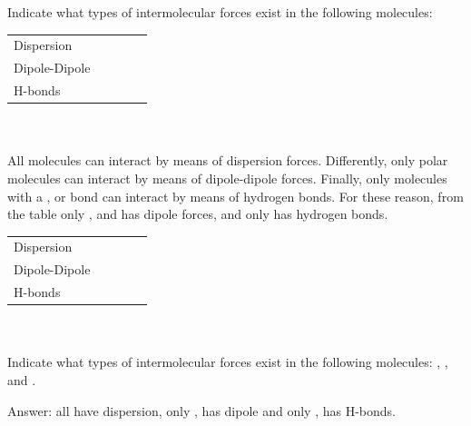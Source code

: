 \documentclass[main.tex]{subfiles}
\begin{document}
\begin{description}
\begin{example} %
Indicate what types of intermolecular forces exist in the following molecules:\\
\begin{tabularx}{\textwidth}{
    >{\centering}m{.185\linewidth} 
    *{4}{Y} }
  \toprule
 &   &    & &    \\
    \midrule
   Dispersion & 	 &		 &    &		   \\
  Dipole-Dipole& 	 &		&     &		     \\
      H-bonds & 	 &		 &    &		\\    
    \bottomrule
\end{tabularx}
\\
\\
All molecules can interact by means of dispersion forces. Differently, only polar molecules can interact by means of dipole-dipole forces. Finally, only molecules with a  ,  or  bond can interact by means of hydrogen bonds. For these reason, from the table only ,   and  has dipole forces, and only  has hydrogen bonds.
\begin{tabularx}{\textwidth}{
    >{\centering}m{.185\linewidth} 
    *{4}{Y} }
  \toprule
 &   &    & &    \\
    \midrule
   Dispersion & 	\checkmark &	\checkmark	 & \checkmark   &\checkmark		   \\
  Dipole-Dipole&  \checkmark	 &	\xmark 	& \checkmark    &\checkmark		     \\
      H-bonds & 	\xmark  &\xmark 		 &\checkmark    &\xmark 		\\    
    \bottomrule
\end{tabularx}
\\
\faDiamond\ \\
Indicate what types of intermolecular forces exist in the following molecules: , , and .
\begin{flushright} Answer: all have dispersion, only ,  has dipole and only ,  has H-bonds.\end{flushright}
\end{example}%




\end{description}
\end{document}
